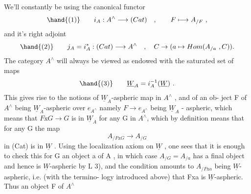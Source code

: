 We'll constantly be using the canonical functor
\[ \hand{(1)} \qquad i_A : A^{\wedge} \longrightarrow (Cat) \quad , \qquad F \longmapsto A_{/F} \ , \]
and it's  right adjoint
\[ \hand{(2)} \qquad j_A = i_A^{*} : (Cat) \longrightarrow A^{\wedge} \quad , \quad C \to (a \mapsto Hom(A_{/a} \ , C)). \]
The category $A^{\wedge}$ will always be viewed as endowed with the saturated set
of maps
\[ \hand{(3)} \qquad \underline{W}_A = i_A^{-1}(\underline{W}) \ . \]
This gives rise to the notions of $\underline{W}_A$-aspheric map in $A^{\wedge}$ , and of an ob-%
ject  F of $A^{\wedge}$ being $\underline{W}_A$-aspheric over $e_{A^{\wedge}}$ namely $F \to e_{A^{\wedge}}$ being $\underline{W}_A$ -
aspheric,  which means that $F\mathrm{x}G \to G$ is in $\underline{W}_A$ for any
G in $A^{\wedge}$, which by definition means that for any G the map
\[ A_{/F\mathrm{x}G} \longrightarrow A_{/G} \]
in (Cat) is in $\underline{W}$ . Using the localization axiom on $\underline{W}$ ,  one sees
that it is enough to check this for G an object a of A , in which case
$A_{/G} = A_{/a}$ has a final object and hence is $\underline{W}$-aspheric by L 3), and the
condition amounts to $A_{/F\mathrm{x}a}$ being $\underline{W}$-aspheric, i.e. (with the termino-%
logy introduced above) that Fxa is $\underline{W}$-aspheric. Thus an object F of $A^{\wedge}$

